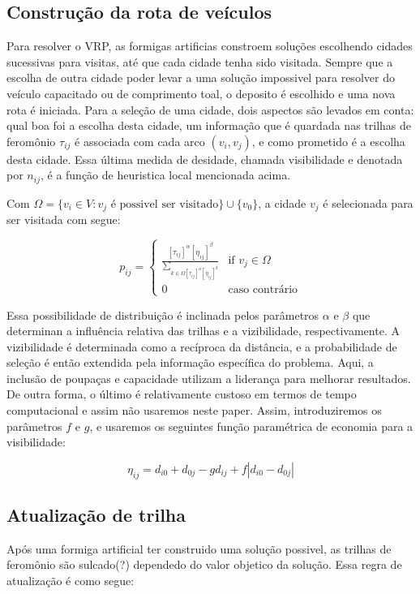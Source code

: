 \documentclass[a4paper, 12pt]{article}
\begin{document}
\subsection{Construção da rota de veículos}

 Para resolver o VRP, as formigas artificias constroem soluções escolhendo cidades sucessivas para
visitas, até que cada cidade tenha sido visitada. Sempre que a escolha de outra cidade poder levar a
uma solução impossivel para resolver do veículo capacitado ou de comprimento toal, o deposito é
escolhido e uma nova rota é iniciada. Para a seleção de uma cidade, dois aspectos são levados em
conta: qual boa foi a escolha desta cidade, um informação que é quardada nas trilhas de feromônio
$\tau_{ij}$ é associada com cada arco $(v_i, v_j)$, e como prometido é a escolha desta cidade. Essa
última medida de desidade, chamada visibilidade e denotada por $n_{ij}$, é a função de heuristica
local mencionada acima.


 Com $\Omega = \{ v_i \in V: v_j\textrm{ é possivel ser visitado} \} \cup \{v_0\}$, a cidade $v_j$ é
selecionada para ser visitada com segue:

\[p_{ij} = \left\{
\begin{array}{ll}
\frac{[\tau_{ij}]^\alpha[\eta_{ij}]^\beta}{\sum_{k\in\Omega[\tau_{ij}]^\alpha[\eta_{ij}]^\beta}}
& \textrm{if } v_j \in \Omega\\
0 & \textrm{caso contrário}
\end{array}\right.\]

 Essa possibilidade de distribuição é inclinada pelos parâmetros $\alpha$ e $\beta$ que determinan a
influência relativa das trilhas e a vizibilidade, respectivamente. A vizibilidade é determinada como
a recíproca da distância, e a probabilidade de seleção é então extendida pela informação específica
do problema. Aqui, a inclusão de poupaças e capacidade utilizam a liderança para melhorar
resultados. De outra forma, o último é relativamente custoso em termos de tempo computacional e
assim não usaremos neste paper. Assim, introduziremos os parâmetros $f$ e $g$, e usaremos os
seguintes função paramétrica de economia para a visibilidade:

 \[\eta_{ij} = d_{i0}+d_{0j}-gd_{ij}+f|d_{i0}-d_{0j}|\]

\subsection{Atualização de trilha}

 Após uma formiga artificial ter construido uma solução possivel, as trilhas de feromônio são
sulcado(?) dependedo do valor objetico da solução. Essa regra de atualização é como segue:
\end{document}
